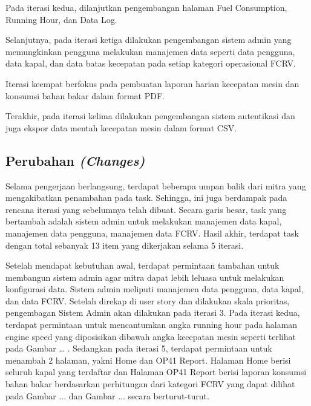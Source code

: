 Pada iterasi kedua, dilanjutkan pengembangan halaman Fuel Consumption, Running Hour, dan Data Log.



Selanjutnya, pada iterasi ketiga dilakukan pengembangan sistem admin yang memungkinkan pengguna melakukan manajemen data seperti data pengguna, data kapal, dan data batas kecepatan pada setiap kategori operasional FCRV.



Iterasi keempat berfokus pada pembuatan laporan harian kecepatan mesin dan konsumsi bahan bakar dalam format PDF.



Terakhir, pada iterasi kelima dilakukan pengembangan sistem autentikasi dan juga ekspor data mentah kecepatan mesin dalam format CSV.



\subsection{Perubahan \textit{(Changes)}}

Selama pengerjaan berlangsung, terdapat beberapa umpan balik dari mitra yang mengakibatkan penambahan pada task. Sehingga, ini juga berdampak pada rencana iterasi yang sebelumnya telah dibuat. Secara garis besar, task yang bertambah adalah sistem admin untuk melakukan manajemen data kapal, manajemen data pengguna, manajemen data FCRV. Hasil akhir, terdapat task dengan total sebanyak 13 item yang dikerjakan selama 5 iterasi.



Setelah mendapat kebutuhan awal, terdapat permintaan tambahan untuk membangun sistem admin agar mitra dapat lebih leluasa untuk melakukan konfigurasi data. Sistem admin meliputi manajemen data pengguna, data kapal, dan data FCRV. Setelah direkap di user story dan dilakukan skala prioritas, pengembagan Sistem Admin akan dilakukan pada iterasi 3.
Pada iterasi kedua, terdapat permintaan untuk mencantumkan angka running hour pada halaman engine speed yang diposisikan dibawah angka kecepatan mesin seperti terlihat pada Gambar … . Sedangkan pada iterasi 5, terdapat permintaan untuk menambah 2 halaman, yakni Home dan OP41 Report. Halaman Home berisi seluruh kapal yang terdaftar dan Halaman OP41 Report berisi laporan konsumsi bahan bakar berdasarkan perhitungan dari kategori FCRV yang dapat dilihat pada Gambar ... dan Gambar ... secara berturut-turut.


